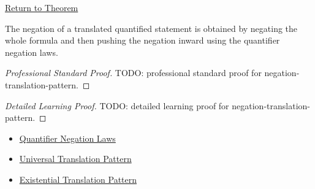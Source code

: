 \newpage
{}
\label{prf:negation-translation-pattern}

\begin{remark*}[Return]
\hyperref[prop:negation-translation-pattern]{Return to Theorem}
\end{remark*}

\begin{proposition*}
The negation of a translated quantified statement is obtained by negating the
whole formula and then pushing the negation inward using the quantifier
negation laws.
\end{proposition*}

\begin{proof}[Professional Standard Proof]
\LRAProofBodyStart
TODO: professional standard proof for negation-translation-pattern.
\end{proof}

\begin{proof}[Detailed Learning Proof]
\LRAProofBodyStart
TODO: detailed learning proof for negation-translation-pattern.
\end{proof}

\begin{remark*}
\end{remark*}

\begin{dependencies}
\begin{itemize}
  \item \hyperref[thm:qneg]{Quantifier Negation Laws}
  \item \hyperref[prop:universal-translation-pattern]{Universal Translation Pattern}
  \item \hyperref[prop:existential-translation-pattern]{Existential Translation Pattern}
\end{itemize}
\end{dependencies}

\clearpage
